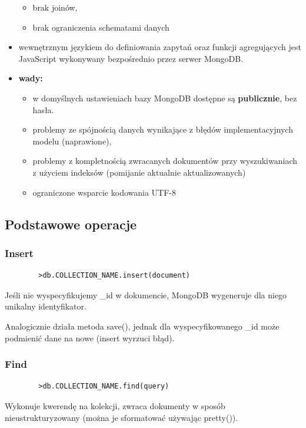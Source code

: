 \documentclass[a4paper]{article}
\begin{document}
\begin{itemize}[noitemsep]
\begin{itemize}[noitemsep]
            \item brak joinów,
            \item brak ograniczenia schematami danych
        \end{itemize}
        \item wewnętrznym językiem do definiowania zapytań oraz funkcji agregujących jest JavaScript wykonywany
        bezpośrednio przez serwer MongoDB.
        \item \textbf{wady:}
        \begin{itemize}[noitemsep]
            \item w domyślnych ustawieniach bazy MongoDB dostępne są \textbf{publicznie}, bez hasła.
            \item problemy ze spójnością danych wynikające z błędów implementacyjnych modelu (naprawione),
            \item problemy z kompletnością zwracanych dokumentów przy wyszukiwaniach z użyciem indeksów (pomijanie
            aktualnie aktualizowanych)
            \item ograniczone wsparcie kodowania UTF-8
        \end{itemize}
    \end{itemize}

    \subsection{Podstawowe operacje}

    \subsubsection{Insert}
    \begin{verbatim}
        >db.COLLECTION_NAME.insert(document)
    \end{verbatim}
    Jeśli nie wyspecyfikujemy \_id w dokumencie, MongoDB wygeneruje dla niego unikalny identyfikator.

    Analogicznie działa metoda save(), jednak dla wyspecyfikowanego \_id może podmienić dane na nowe (insert wyrzuci
    błąd).

    \subsubsection{Find}
    \begin{verbatim}
        >db.COLLECTION_NAME.find(query)
    \end{verbatim}
    Wykonuje kwerendę na kolekcji, zwraca dokumenty w sposób nieustrukturyzowany (można je sformatować używając pretty()).
\end{document}
